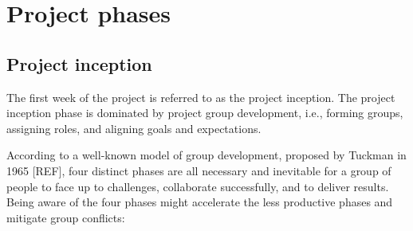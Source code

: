 \documentclass{scrreprt}
\begin{document}
\chapter{Project phases}

\section{Project inception}
The first week of the project is referred to as the project inception. The project inception phase is dominated by project group development, i.e., forming groups, assigning roles, and aligning goals and expectations.

According to a well-known model of group development, proposed by Tuckman in 1965 [REF], four distinct phases are all necessary and inevitable for a group of people to face up to challenges, collaborate successfully, and to  deliver results. Being aware of the four phases might accelerate the less productive phases and mitigate group conflicts:
\end{document}
